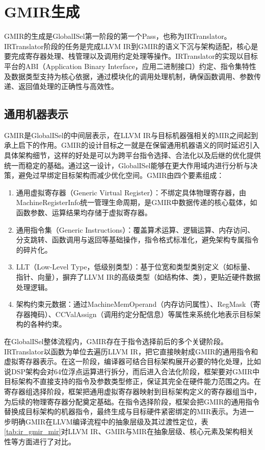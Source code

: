 \section{GMIR生成}
GMIR的生成是GlobalISel第一阶段的第一个Pass，也称为IRTranslator。IRTranslator阶段的任务是完成LLVM IR到GMIR的语义下沉与架构适配，核心是要完成寄存器处理、栈管理以及调用约定处理等操作。IRTranslator的实现以目标平台的ABI（Application Binary Interface，应用二进制接口）约定、指令集特性及数据类型支持为核心依据，通过模块化的调用处理机制，确保函数调用、参数传递、返回值处理的正确性与高效性。


\subsection{通用机器表示}
GMIR是GlobalISel的中间层表示，在LLVM IR与目标机器强相关的MIR之间起到承上启下的作用。GMIR的设计目标之一就是在保留通用机器语义的同时延迟引入具体架构细节，这样的好处是可以为跨平台指令选择、合法化以及后继的优化提供统一而稳定的基础。通过这一设计，GlobalISel能够在更大作用域内进行分析与决策，避免过早绑定目标架构而减少优化空间。GMIR由四个要素组成：

\begin{enumerate}
	\item
	通用虚拟寄存器（Generic Virtual Register）：不绑定具体物理寄存器，由MachineRegisterInfo统一管理生命周期，是GMIR中数据传递的核心载体，如函数参数、运算结果均存储于虚拟寄存器。
	
	\item
	通用指令集（Generic Instructions）：覆盖算术运算、逻辑运算、内存访问、分支跳转、函数调用与返回等基础操作，指令格式标准化，避免架构专属指令的碎片化。
	
	\item 
	LLT（Low-Level Type，低级别类型）：基于位宽和类型类别定义（如标量、指针、向量），摒弃了LLVM IR的高级类型（如结构体、类），更贴近硬件数据处理逻辑。
	
	\item 
	架构约束元数据：通过MachineMemOperand（内存访问属性）、RegMask（寄存器掩码）、CCValAssign（调用约定分配信息）等属性来系统化地表示目标架构的各种约束。
	
\end{enumerate}

在GlobalISel整体流程内，GMIR存在于指令选择前后的多个关键阶段。IRTranslator以函数为单位去遍历LLVM IR，把它直接映射成GMIR的通用指令和虚拟寄存器表示。在这一阶段，编译器可结合目标架构展开必要的特化处理，比如说DSP架构会对64位浮点运算进行拆分，而后进入合法化阶段，框架要对GMIR中目标架构不直接支持的指令及参数类型修正，保证其完全在硬件能力范围之内。在寄存器组选择阶段，框架把通用虚拟寄存器映射到目标架构定义的寄存器组当中，为后续的物理寄存器分配奠定基础。在指令选择阶段，框架会把GMIR的通用指令替换成目标架构的机器指令，最终生成与目标硬件紧密绑定的MIR表示。为进一步明确GMIR在LLVM编译流程中的抽象层级及其过渡性定位，表\ref{tab:ir_gmir_mir}对LLVM IR、GMIR与MIR在抽象层级、核心元素及架构相关性等方面进行了对比。


